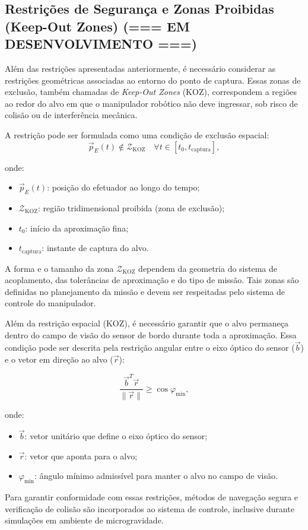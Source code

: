 \subsection{Restrições de Segurança e Zonas Proibidas (Keep-Out Zones) (=== EM DESENVOLVIMENTO ===)}

Além das restrições apresentadas anteriormente, é necessário considerar as restrições geométricas associadas ao entorno do ponto de captura.  
Essas zonas de exclusão, também chamadas de \emph{Keep-Out Zones} (KOZ), correspondem a regiões ao redor do alvo em que o manipulador robótico não deve ingressar, sob risco de colisão ou de interferência mecânica.

A restrição pode ser formulada como uma condição de exclusão espacial:
\begin{equation}
\label{eq:koz}
\vec{p}_E(t) \notin \mathcal{Z}_{\text{KOZ}} \quad \forall t \in [t_0, t_{\text{captura}}],
\end{equation}

onde:
\begin{itemize}
    \item $\vec{p}_E(t)$: posição do efetuador ao longo do tempo;
    \item $\mathcal{Z}_{\text{KOZ}}$: região tridimensional proibida (zona de exclusão);
    \item $t_0$: início da aproximação fina;
    \item $t_{\text{captura}}$: instante de captura do alvo.
\end{itemize}

A forma e o tamanho da zona $\mathcal{Z}_{\text{KOZ}}$ dependem da geometria do sistema de acoplamento, das tolerâncias de aproximação e do tipo de missão.  
Tais zonas são definidas no planejamento da missão e devem ser respeitadas pelo sistema de controle do manipulador.

Além da restrição espacial (KOZ), é necessário garantir que o alvo permaneça dentro do campo de visão do sensor de bordo durante toda a aproximação.  
Essa condição pode ser descrita pela restrição angular entre o eixo óptico do sensor ($\vec{b}$) e o vetor em direção ao alvo ($\vec{r}$):

\begin{equation}
\label{eq:fov}
\frac{\vec{b}^T \vec{r}}{\|\vec{r}\|} \geq \cos \varphi_{\min},
\end{equation}

onde:
\begin{itemize}
    \item $\vec{b}$: vetor unitário que define o eixo óptico do sensor;
    \item $\vec{r}$: vetor que aponta para o alvo;
    \item $\varphi_{\min}$: ângulo mínimo admissível para manter o alvo no campo de visão.
\end{itemize}

Para garantir conformidade com essas restrições, métodos de navegação segura e verificação de colisão são incorporados ao sistema de controle, inclusive durante simulações em ambiente de microgravidade.
